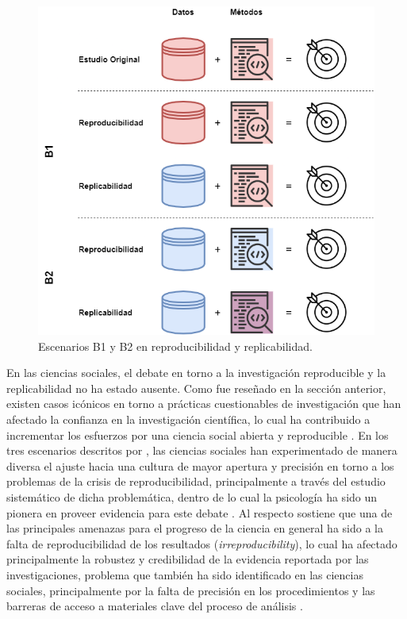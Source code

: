 \documentclass[
]{book}
\begin{document}
\begin{figure}[H]

{\centering \includegraphics[width=0.75\linewidth]{docs/images/reproducibility} 

}

\caption{Escenarios B1 y B2 en reproducibilidad y replicabilidad.}\label{fig:scenarios}
\end{figure}

En las ciencias sociales, el debate en torno a la investigación reproducible y la replicabilidad no ha estado ausente. Como fue reseñado en la sección anterior, existen casos icónicos en torno a prácticas cuestionables de investigación que han afectado la confianza en la investigación científica, lo cual ha contribuido a incrementar los esfuerzos por una ciencia social abierta y reproducible \citep{breznau_Does_2021, nosek_Promoting_2015}. En los tres escenarios descritos por \citet{barba_Terminologies_2018}, las ciencias sociales han experimentado de manera diversa el ajuste hacia una cultura de mayor apertura y precisión en torno a los problemas de la crisis de reproducibilidad, principalmente a través del estudio sistemático de dicha problemática, dentro de lo cual la psicología ha sido un pionera en proveer evidencia para este debate \citep{opensciencecollaboration_Estimating_2015, gilbert_Comment_2016}. Al respecto \citet{bishop_Rein_2019} sostiene que una de las principales amenazas para el progreso de la ciencia en general ha sido a la falta de reproducibilidad de los resultados (\emph{irreproducibility}), lo cual ha afectado principalmente la robustez y credibilidad de la evidencia reportada por las investigaciones, problema que también ha sido identificado en las ciencias sociales, principalmente por la falta de precisión en los procedimientos y las barreras de acceso a materiales clave del proceso de análisis \citep{freese_Replication_2017}.
\end{document}
